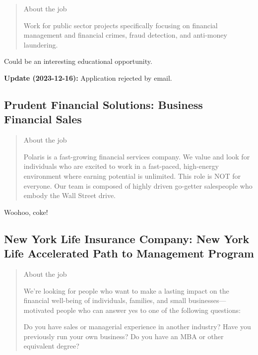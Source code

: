 \documentclass[
	letterpaper, %
	12pt, %
]{CSSullivanBusinessReport}
\begin{document}
\begin{quote}
	About the job
	
	Work for public sector projects specifically focusing on financial management and financial crimes, fraud detection, and anti-money laundering. 

\end{quote}

Could be an interesting educational opportunity. 

\textbf{Update (2023-12-16):} Application rejected by email.



\subsection[Prudent Financial Solutions]{Prudent Financial Solutions: Business Financial Sales}

\begin{quote}
	About the job
	
	Polaris is a fast-growing financial services company. We value and look for individuals who are excited to work in a fast-paced, high-energy environment where earning potential is unlimited. This role is NOT for everyone. Our team is composed of highly driven go-getter salespeople who embody the Wall Street drive.

\end{quote}

Woohoo, coke!


\subsection[New York Life Insurance Company]{New York Life Insurance Company: New York Life Accelerated Path to Management Program}

\begin{quote}
	About the job
	
	We're looking for people who want to make a lasting impact on the financial well-being of individuals, families, and small businesses—motivated people who can answer yes to one of the following questions:

    Do you have sales or managerial experience in another industry?
    Have you previously run your own business?
    Do you have an MBA or other equivalent degree?

\end{quote}
\end{document}
